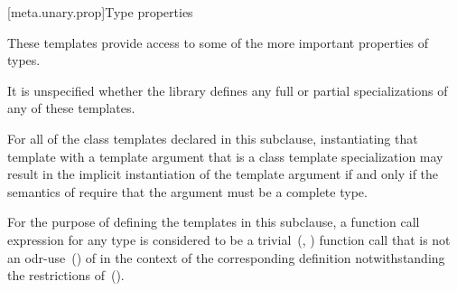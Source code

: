 [meta.unary.prop]{Type properties}

\pnum
These templates provide access to some of the more important properties of types.

\pnum
It is unspecified whether the library defines any full or partial specializations
of any of these templates.

\pnum
For all of the class templates  declared in this subclause, instantiating
that template with a template argument that is a class template specialization may
result in the implicit instantiation of the template argument if and only if the
semantics of  require that the argument must be a complete type.

\pnum
For the purpose of defining the templates in this subclause, a function call
expression  for any type  is considered to be a
trivial~(, ) function call that is not an
odr-use~() of  in the context of the
corresponding definition notwithstanding the restrictions of~().

